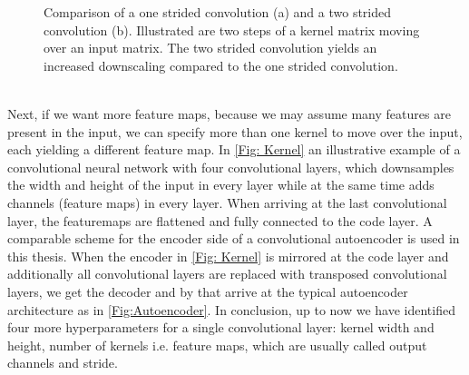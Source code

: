 \begin{figure}[htbp!]
	\begin{subfigure}{.459\textwidth}
		\centering
		
		\label{Fig: Downsampling(a)}
	\end{subfigure}\hfill
	\begin{subfigure}{.441\textwidth}
		\centering
		
		\label{Fig: Downsampling(b)}
	\end{subfigure}
	\caption{Comparison of a one strided convolution (a) and a two strided convolution (b). Illustrated are two steps of a kernel matrix moving over an input matrix. The two strided convolution yields an increased downscaling compared to the one strided convolution.}
	\label{Fig: Downsampling}
\end{figure}
\\Next, if we want more feature maps, because we may assume many features are present in the input, we can specify more than one kernel to move over the input, each yielding a different feature map. In \cref{Fig: Kernel} an illustrative example of a convolutional neural network with four convolutional layers, which downsamples the width and height of the input in every layer while at the same time adds channels (feature maps) in every layer. When arriving at the last convolutional layer, the featuremaps are flattened and fully connected to the code layer. A comparable scheme for the encoder side of a convolutional autoencoder is used in this thesis. When the encoder in \cref{Fig: Kernel} is mirrored at the code layer and additionally all convolutional layers are replaced with transposed convolutional layers, we get the decoder and by that arrive at the typical autoencoder architecture as in \cref{Fig:Autoencoder}. In conclusion, up to now we have identified four more hyperparameters for a single convolutional layer: kernel width and height, number of kernels i.e. feature maps, which are usually called output channels and stride.\\
